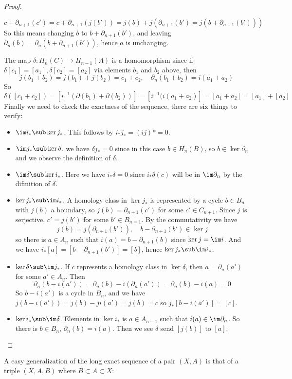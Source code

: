 \begin{proof}
\begin{itemize}
	\[c+\partial_{n+1}(c')=c+\partial_{n+1}(j(b'))=j(b)+j(\partial_{n+1}(b')=j(b+\partial_{n+1}(b')))\]
	So this means changing $b$ to $b+\partial_{n+1}(b')$, and leaving $\partial_{n}(b)=\partial_{n}(b+\partial_{n+1}(b'))$, hence $a$ is unchanging.
\end{itemize}
The map $\delta: H_n(C)\to H_{n-1}(A)$ is a homomorphism since if $\delta[c_1]=[a_1], \delta[c_2]=[a_2]$ via elements $b_1$ and $b_2$ above, then
\[j(b_1+b_2)=j(b_1)+j(b_2)=c_1+c_2,\quad \partial_{n}(b_1+b_2)=i(a_1+a_2)\]
So \[\delta([c_1+c_2])=[i^{-1}(\partial(b_1)+\partial(b_2))]=[i^{-1}(i(a_1+a_2)]=[a_1+a_2]=[a_1]+[a_2]\]
Finally we need to check the exactness of the sequence, there are six things to verify:
\begin{itemize}
	\item $\im i_*\sub\ker j_*$. This follows by $i_*j_*=(ij)*=0$.
	\item $\im j_*\sub\ker \delta$. we have $\delta j_*=0$ since in this case $b\in H_n(B)$, so $b\in\ker\partial_n$ and we observe the definition of $\delta$.
	\item $\im\delta\sub\ker i_*$. Here we have $i_*\delta=0$ since $i_*\delta(c)$ will be in $\im\partial_n$ by the difinition of $\delta$.
	\item $\ker j_*\sub\im i_*$. A homology class in $\ker j_*$ is represented by a cycle $b\in B_n$ with $j(b)$ a boundary, so $j(b)=\partial_{n+1}(c')$ for some $c'\in C_{n+1}$. Since $j$ is serjective, $c'=j(b')$ for some $b'\in B_{n=1}$. By the commutativity we have
	\[j(b)=j(\partial_{n+1}(b')),\quad b-\partial_{n+1}(b')\in \ker j\]
	so there is $a\in A_n$ such that $i(a)=b-\partial_{n+1}(b)$ since $\ker j=\im i$.
	And we have $i_*[a]=[b-\partial_{n+1}(b')]=[b]$, hence $\ker j_*\sub\im i_*$.
	\item $\ker\delta\sub\im j_*$. If $c$ represents a homology class in $\ker\delta$, then $a=\partial_n(a')$ for some $a'\in A_n$. Then
	\[\partial_n(b-i(a'))=\partial_{n}(b)-i(\partial_{n}(a'))=\partial_{n}(b)-i(a)=0\]
	So $b-i(a')$ is a cycle in $B_n$, and we have $j(b-i(a'))=j(b)-ji(a')=j(b)=c$ so $j_*[b-i(a')]=[c]$.
	\item $\ker i_*\sub\im\delta$. Elements in $\ker i_*$ is $a\in A_{n-1}$ such that $i(a)\in\im\partial_n$. So there is $b\in B_n$, $\partial_n(b)=i(a)$. Then we see $\delta$ send $[j(b)]$ to $[a]$.
\end{itemize}
\end{proof}
A easy generalization of the long exact sequence of a pair $(X,A)$ is that of a triple $(X,A,B)$ where $B\subset A\subset X$:
